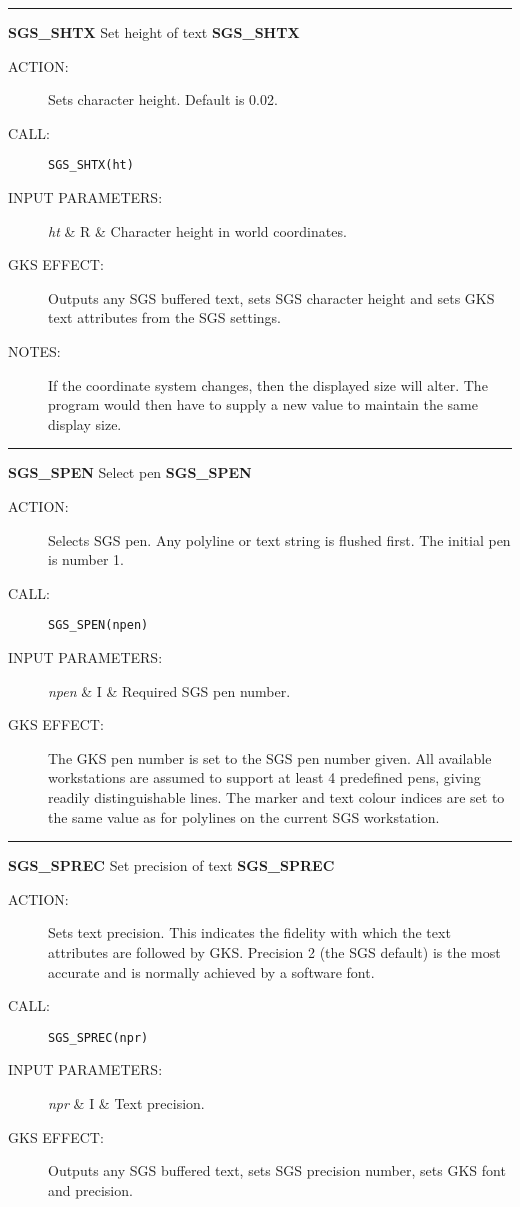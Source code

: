 \rule{\textwidth}{0.3mm}
{\Large {\bf SGS\_SHTX} \hfill Set height of text \hfill {\bf SGS\_SHTX}}
\begin{description}
\item [ACTION:]
Sets character height.
Default is 0.02.
\item [CALL:]
{\tt SGS\_SHTX(ht)}
\item [INPUT PARAMETERS:]
\begin{params}
{\em ht}  & R  & Character height in world coordinates.
\end{params}
\item [GKS EFFECT:]
Outputs any SGS buffered text, sets SGS character height and sets GKS text
attributes from the SGS settings.
\item [NOTES:]
If the coordinate system changes, then the displayed size will alter.
The program would then have to supply a new value to maintain the same display
size.
\end{description}
\goodbreak

\rule{\textwidth}{0.3mm}
{\Large {\bf SGS\_SPEN} \hfill Select pen \hfill {\bf SGS\_SPEN}}
\begin{description}
\item [ACTION:]
Selects SGS pen.
Any polyline or text string is flushed first.
The initial pen is number 1.
\item [CALL:]
{\tt SGS\_SPEN(npen)}
\item [INPUT PARAMETERS:]
\begin{params}
{\em npen}  & I  & Required SGS pen number.
\end{params}
\item [GKS EFFECT:]
The GKS pen number is set to the SGS pen number given.
All available workstations are assumed to support at least 4 predefined pens,
giving readily distinguishable lines.
The marker and text colour indices are set to the same value as for polylines on
the current SGS workstation.
\end{description}
\goodbreak

\rule{\textwidth}{0.3mm}
{\Large {\bf SGS\_SPREC} \hfill Set precision of text \hfill {\bf SGS\_SPREC}}
\begin{description}
\item [ACTION:]
Sets text precision.
This indicates the fidelity with which the text attributes are followed by GKS.
Precision 2 (the SGS default) is the most accurate and is normally achieved by
a software font.
\item [CALL:]
{\tt SGS\_SPREC(npr)}
\item [INPUT PARAMETERS:]
\begin{params}
{\em npr}  & I  & Text precision.
\end{params}
\item [GKS EFFECT:]
Outputs any SGS buffered text, sets SGS precision number, sets GKS font and
precision.
\end{description}
\goodbreak

